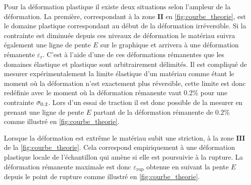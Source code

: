 Pour la déformation plastique il existe deux situations selon l'ampleur de la déformation. La première, correspondant à la zone $\mathbf{II}$ en \autoref{fig:courbe_theorie}, est le domaine plastique correspondant au début de la déformation irréversible. Si la contrainte est diminuée depuis ces niveaux de déformation le matériau suivra également une ligne de pente $E$ sur le graphique et arrivera à une déformation rémanente $\varepsilon_{\textrm{r}}$. C'est à l'aide d'une de ces déformations rémanentes que les domaines élastique et plastique sont arbitrairement délimités. Il est compliqué de mesurer expérimentalement la limite élastique d'un matériau comme étant le moment où la déformation n'est exactement plus réversible, cette limite est donc redéfinie avec le moment où la déformation rémanente vaut 0.2\% pour une contrainte $\sigma_{0.2}$. Lors d'un essai de traction il est donc possible de la mesurer en prenant une ligne de pente $E$ partant de la déformation rémanente de 0.2\% comme illustré en \autoref{fig:courbe_theorie}.

Lorsque la déformation est extrême le matériau subit une striction, à la zone $\mathbf{III}$ de la \autoref{fig:courbe_theorie}. Cela correspond empiriquement à une déformation plastique locale de l'échantillon qui amène si elle est poursuivie à la rupture. La déformation rémanente maximale est donc $\varepsilon_\mathrm{rup}$ obtenue en suivant la pente $E$ depuis le point de rupture comme illustré en \autoref{fig:courbe_theorie}.

